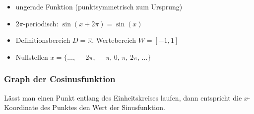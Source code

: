 \begin{itemize}
    \item ungerade Funktion (punktsymmetrisch zum Ursprung) 
    \item $2\pi$-periodisch: $\sin{(x+2\pi)} = \sin{(x)}$
    \item Definitionsbereich $D=\mathbb{R}$, Wertebereich $W=[-1,1]$
    \item Nullstellen $x=\{ \dots,\,-2\pi,\,-\pi,\,0,\,\pi,\,2\pi,\,\dots \}$ 
\end{itemize}

\subsubsection{Graph der Cosinusfunktion}
Lässt man einen Punkt entlang des Einheitskreises laufen, dann entspricht die $x$-Koordinate des Punktes den Wert der Sinusfunktion.
